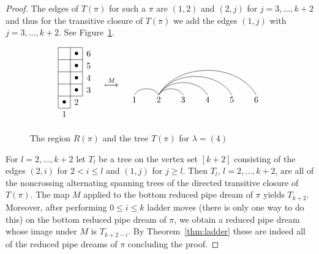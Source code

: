 \documentclass[10pt]{amsart}
\theoremstyle{definition}
\numberwithin{equation}{section}
\newcommand{\lmp}[1]{\mathrel{\mathop{\longmapsto}^{#1}}}
\newcommand*\+{\smash{\lower2pt\hbox{\rlap{\vrule height14pt}}\raise2pt\hbox{\rlap{\hskip-3pt \vrule height.4pt depth0pt width14.7pt}}}}
\begin{document}
\begin{proof}
The edges of $T(\pi)$ for such a $\pi$ are $(1,2)$ and $(2,j)$ for $j=3,\dots,k+2$ and thus for the transitive closure of $T(\pi)$ we add the edges $(1,j)$ with $j=3,\dots,k+2$. See Figure~\ref{fig:4}.

\begin{figure}[h]
\[
\begin{aligned}
\begin{tikzpicture}
\draw (0,0.5)--(0,0)--(0.5,0)--(0.5,2.5)--(1,2.5)--(1,0.5)--(0,0.5)--(0,2)--(1,2);
\draw (0,2)--(0,2.5)--(.5,2.5);
\draw (0,1.5)--(1,1.5);
\draw (0,1)--(1,1);
\draw (0.25,0.25) node {$\bullet$};
\draw (0.75,0.75) node {$\bullet$};
\draw (0.75,1.25) node {$\bullet$};
\draw (0.75,1.75) node {$\bullet$};
\draw (0.75,2.25) node {$\bullet$};
\draw (0.25,-0.25) node {1};
\draw (0.75,0.25) node {2};
\draw (1.25,0.75) node {3};
\draw (1.25,1.25) node {4};
\draw (1.25,1.75) node {5};
\draw (1.25,2.25) node {6};
\end{tikzpicture}
\end{aligned}
\quad \lmp{M}\quad
\begin{aligned}
\begin{tikzpicture}
\path (1,0) edge [bend left=60] (2,0);
\path (2,0) edge [bend left=60] (3,0);
\path (2,0) edge [bend left=60] (4,0);
\path (2,0) edge [bend left=60] (5,0);
\path (2,0) edge [bend left=60] (6,0);
\draw[] (1,-0.2) node {1};
\draw[] (2,-0.2) node {2};
\draw[] (3,-0.2) node {3};
\draw[] (4,-0.2) node {4};
\draw[] (5,-0.2) node {5};
\draw[] (6,-0.2) node {6};
\end{tikzpicture}
\end{aligned}
\]
\caption{The region $R(\pi)$ and the tree $T(\pi)$ for $\lambda=(4)$} \label{fig:4}
\end{figure}

For $l=2,\dots,k+2$ let $T_l$ be a tree on the vertex set $[k+2]$ consisting of the edges $(2,i)$ for $2<i\leq l$ and $(1,j)$ for $j\geq l$. Then $T_l$, $l=2,\dots,k+2$, are all of the noncrossing alternating spanning trees of the directed transitive closure of $T(\pi)$. The map $M$ applied to the bottom reduced pipe dream of $\pi$ yields $T_{k+2}$. Moreover, after performing $0\leq i\leq k$ ladder moves (there is only one way to do this) on the bottom reduced pipe dream of $\pi$, we obtain a reduced pipe dream whose image under $M$ is $T_{k+2-i}$. By Theorem~\ref{thm:ladder} these are indeed all of the reduced pipe dreams of $\pi$ concluding the proof.
\end{proof}
\end{document}
